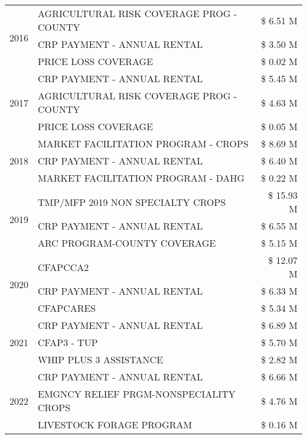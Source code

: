 \begin{tabular}{llr}
\cline{1-3}
\multirow[t]{3}{*}{2016} & AGRICULTURAL RISK COVERAGE PROG - COUNTY & \$ 6.51 M \\
 & CRP PAYMENT - ANNUAL RENTAL & \$ 3.50 M \\
 & PRICE LOSS COVERAGE & \$ 0.02 M \\
\cline{1-3}
\multirow[t]{3}{*}{2017} & CRP PAYMENT - ANNUAL RENTAL & \$ 5.45 M \\
 & AGRICULTURAL RISK COVERAGE PROG - COUNTY & \$ 4.63 M \\
 & PRICE LOSS COVERAGE & \$ 0.05 M \\
\cline{1-3}
\multirow[t]{3}{*}{2018} & MARKET FACILITATION PROGRAM - CROPS & \$ 8.69 M \\
 & CRP PAYMENT - ANNUAL RENTAL & \$ 6.40 M \\
 & MARKET FACILITATION PROGRAM - DAHG & \$ 0.22 M \\
\cline{1-3}
\multirow[t]{3}{*}{2019} & TMP/MFP 2019 NON SPECIALTY CROPS & \$ 15.93 M \\
 & CRP PAYMENT - ANNUAL RENTAL & \$ 6.55 M \\
 & ARC PROGRAM-COUNTY COVERAGE & \$ 5.15 M \\
\cline{1-3}
\multirow[t]{3}{*}{2020} & CFAPCCA2 & \$ 12.07 M \\
 & CRP PAYMENT - ANNUAL RENTAL & \$ 6.33 M \\
 & CFAPCARES & \$ 5.34 M \\
\cline{1-3}
\multirow[t]{3}{*}{2021} & CRP PAYMENT - ANNUAL RENTAL & \$ 6.89 M \\
 & CFAP3 - TUP & \$ 5.70 M \\
 & WHIP PLUS 3 ASSISTANCE & \$ 2.82 M \\
\cline{1-3}
\multirow[t]{3}{*}{2022} & CRP PAYMENT - ANNUAL RENTAL & \$ 6.66 M \\
 & EMGNCY RELIEF PRGM-NONSPECIALITY CROPS & \$ 4.76 M \\
 & LIVESTOCK FORAGE PROGRAM & \$ 0.16 M \\
\cline{1-3}
\bottomrule
\end{tabular}
